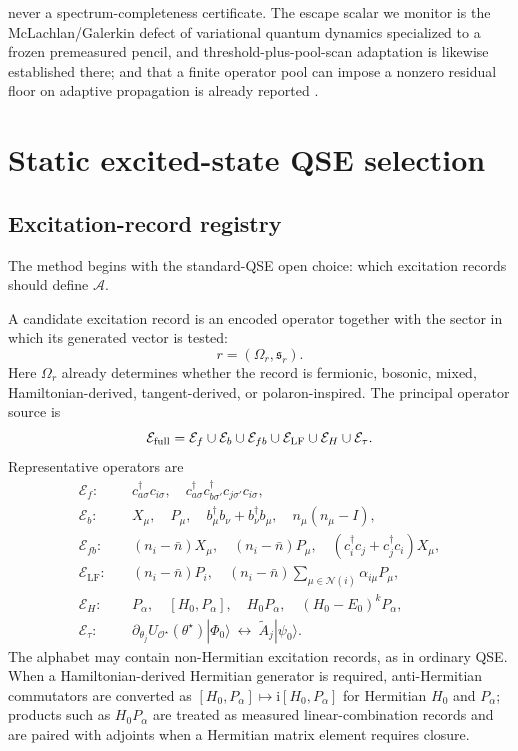 \documentclass[
  reprint,
  amsmath,
  amssymb,
  aps,
  pra,
  nofootinbib,
  superscriptaddress,
  floatfix
]{revtex4-2}
\newcommand{\Oset}{\mathcal{O}}
\newcommand{\Ecal}{\mathcal{E}}
\newcommand{\Acal}{\mathcal{A}}
\newcommand{\ii}{\mathrm{i}}
\newcommand{\lf}{\mathrm{LF}}
\newcommand{\ket}[1]{|#1\rangle}
\begin{document}
never a spectrum-completeness certificate.  The escape scalar we monitor is the McLachlan/Galerkin defect of variational quantum dynamics \cite{Yao2021AVQDS} specialized to a frozen premeasured pencil, and threshold-plus-pool-scan adaptation is likewise established there; and that a finite operator pool can impose a nonzero residual floor on adaptive propagation is already reported \cite{Gomes2023AVQDSGreen}.

\section{Static excited-state QSE selection}
\label{sec:static_qse_method}


\subsection{Excitation-record registry}

The method begins with the standard-QSE open choice: which excitation records should define \(\Acal\).

A candidate excitation record is an encoded operator together with the sector in which its generated vector is tested:
\begin{equation}
r=(\Omega_r,\mathfrak s_r).
\label{eq:qse_record}
\end{equation}
Here \(\Omega_r\) already determines whether the record is fermionic, bosonic, mixed, Hamiltonian-derived, tangent-derived, or polaron-inspired.  The principal operator source is
\begin{equation}
\Ecal_{\rm full}
=
\Ecal_f\cup\Ecal_b\cup\Ecal_{fb}\cup\Ecal_{\lf}
\cup\Ecal_H\cup\Ecal_{\tau}.
\label{eq:alphabet_union}
\end{equation}
Representative operators are
\begin{align}
\Ecal_f:&\quad
c_{a\sigma}^\dagger c_{i\sigma},\quad
c_{a\sigma}^\dagger c_{b\sigma'}^\dagger c_{j\sigma'}c_{i\sigma},
\nonumber\\
\Ecal_b:&\quad
X_\mu,\quad P_\mu,\quad b_\mu^\dagger b_\nu+b_\nu^\dagger b_\mu,\quad n_\mu(n_\mu-I),
\nonumber\\
\Ecal_{fb}:&\quad
(n_i-\bar n)X_\mu,\quad (n_i-\bar n)P_\mu,\quad
(c_i^\dagger c_j+c_j^\dagger c_i)X_\mu,
\nonumber\\
\Ecal_{\lf}:&\quad
(n_i-\bar n)P_i,\quad
(n_i-\bar n)\sum_{\mu\in\mathcal N(i)}\alpha_{i\mu}P_\mu,
\nonumber\\
\Ecal_H:&\quad
P_\alpha,\quad [H_0,P_\alpha],\quad H_0P_\alpha,\quad (H_0-E_0)^kP_\alpha,
\nonumber\\
\Ecal_\tau:&\quad
\partial_{\theta_j}U_{\Oset^\star}(\theta^\star)\ket{\Phi_0}
\ \leftrightarrow\
\widetilde A_j\ket{\psi_0}.
\label{eq:alphabet_examples}
\end{align}
The alphabet may contain non-Hermitian excitation records, as in ordinary QSE.  When a Hamiltonian-derived Hermitian generator is required, anti-Hermitian commutators are converted as \([H_0,P_\alpha]\mapsto \ii[H_0,P_\alpha]\) for Hermitian \(H_0\) and \(P_\alpha\); products such as \(H_0P_\alpha\) are treated as measured linear-combination records and are paired with adjoints when a Hermitian matrix element requires closure.
\end{document}
